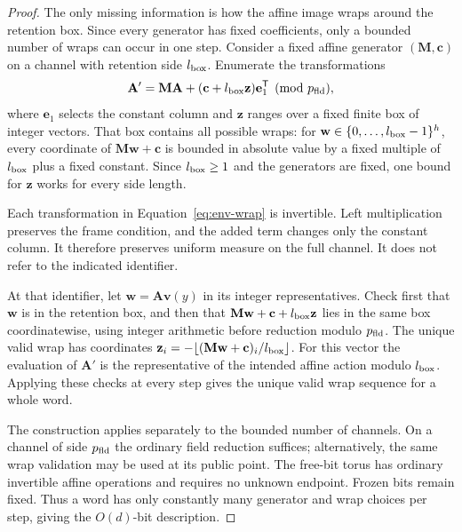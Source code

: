 \documentclass[11pt]{article}
\numberwithin{equation}{section}
\theoremstyle{definition}
\theoremstyle{remark}
\begin{document}
\begin{proof}
The only missing information is how the affine image wraps around the retention box. Since every generator has fixed coefficients, only a bounded number of wraps can occur in one step. Consider a fixed affine generator $({\mathbf{M}},{\mathbf{c}})$ on a channel with retention
side ${l_{\rm box}}$. Enumerate the transformations
\begin{equation}\label{eq:env-wrap}
{\mathbf{A}}'={\mathbf{M}}{\mathbf{A}}+({\mathbf{c}}+{l_{\rm box}}{\mathbf{z}}){\mathbf{e}}_1^{\mathsf T}\pmod {p_{\rm fld}},
\end{equation}
where ${\mathbf{e}}_1$ selects the constant column and ${\mathbf{z}}$ ranges over a fixed
finite box of integer vectors. That box contains all possible wraps:
for ${\mathbf{w}}\in\{0,\ldots,{l_{\rm box}}-1\}^{h}$, every coordinate of ${\mathbf{M}}{\mathbf{w}}+{\mathbf{c}}$ is bounded
in absolute value by a fixed multiple of ${l_{\rm box}}$ plus a fixed constant.
Since ${l_{\rm box}}\ge1$ and the generators are fixed, one bound for ${\mathbf{z}}$ works
for every side length.

Each transformation in Equation~\eqref{eq:env-wrap} is invertible.
Left multiplication preserves the frame condition, and the added
term changes only the constant column. It therefore preserves uniform
measure on the full channel. It does not refer to the indicated
identifier.

At that identifier, let ${\mathbf{w}}={\mathbf{A}}{\mathbf{v}}(y)$ in its integer representatives.
Check first that ${\mathbf{w}}$ is in the retention box, and then that
${\mathbf{M}}{\mathbf{w}}+{\mathbf{c}}+{l_{\rm box}}{\mathbf{z}}$ lies in the same box coordinatewise, using integer arithmetic
before reduction modulo ${p_{\rm fld}}$. The unique valid wrap has coordinates
${\mathbf{z}}_i=-\lfloor({\mathbf{M}}{\mathbf{w}}+{\mathbf{c}})_i/{l_{\rm box}}\rfloor$. For this vector the evaluation of
${\mathbf{A}}'$ is the representative of the intended affine action modulo ${l_{\rm box}}$.
Applying these checks at every step gives the unique valid wrap
sequence for a whole word.

The construction applies separately to the bounded number of channels.
On a channel of side ${p_{\rm fld}}$ the ordinary field reduction suffices;
alternatively, the same wrap validation may be used at its public
point. The free-bit torus has ordinary invertible affine operations
and requires no unknown endpoint. Frozen bits remain fixed.
Thus a word has only constantly many generator and wrap choices
per step, giving the $O(d)$-bit description.


\end{proof}
\end{document}
